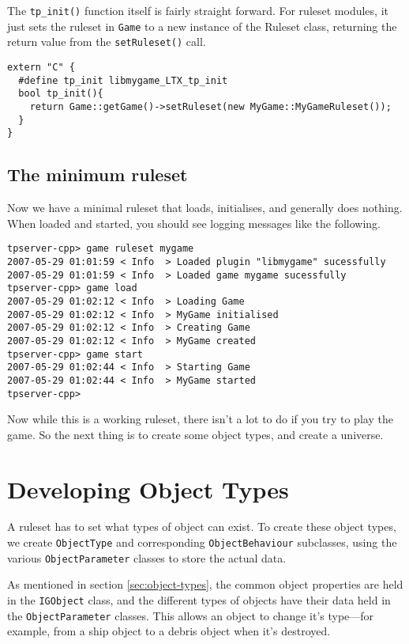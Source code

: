 \documentclass[a4paper,11pt]{report}
\newcommand{\codename}[1]{\texttt{#1}}
\begin{document}
The \codename{tp\_init()} function itself is fairly straight forward. For ruleset modules, it just sets the ruleset in \codename{Game} to a new instance of the Ruleset class, returning the return value from the \codename{setRuleset()} call.

\begin{verbatim}
extern "C" {
  #define tp_init libmygame_LTX_tp_init
  bool tp_init(){
    return Game::getGame()->setRuleset(new MyGame::MyGameRuleset());
  }
}
\end{verbatim}

\section{The minimum ruleset}
Now we have a minimal ruleset that loads, initialises, and generally does nothing. When loaded and started, you should see logging messages like the following.

\begin{verbatim}
tpserver-cpp> game ruleset mygame
2007-05-29 01:01:59 < Info  > Loaded plugin "libmygame" sucessfully
2007-05-29 01:01:59 < Info  > Loaded game mygame sucessfully
tpserver-cpp> game load
2007-05-29 01:02:12 < Info  > Loading Game
2007-05-29 01:02:12 < Info  > MyGame initialised
2007-05-29 01:02:12 < Info  > Creating Game
2007-05-29 01:02:12 < Info  > MyGame created
tpserver-cpp> game start
2007-05-29 01:02:44 < Info  > Starting Game
2007-05-29 01:02:44 < Info  > MyGame started
tpserver-cpp>
\end{verbatim}

Now while this is a working ruleset, there isn't a lot to do if you try to play the game. So the next thing is to create some object types, and create a universe.

\chapter{Developing Object Types}
\label{chap:objectdata-writing}

A ruleset has to set what types of object can exist. To create these object types, we create \codename{ObjectType} and corresponding \codename{ObjectBehaviour} subclasses, using the various \codename{ObjectParameter} classes to store the actual data.

As mentioned in section \ref{sec:object-types}, the common object properties are held in the \codename{IGObject} class, and the different types of objects have their data held in the \codename{ObjectParameter} classes. This allows an object to change it's type---for example, from a ship object to a debris object when it's destroyed.
\end{document}
